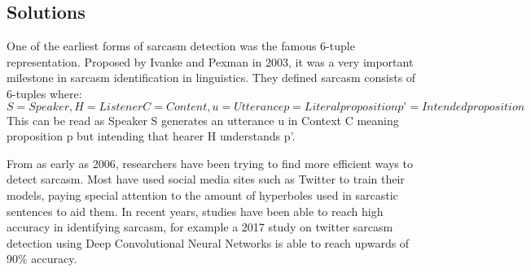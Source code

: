 \documentclass{article}
\begin{document}
	\subsection{Solutions}
	
	One of the earliest forms of sarcasm detection was the famous 6-tuple representation. Proposed by Ivanke and Pexman \cite{stacey} in 2003, it was a very important milestone in sarcasm identification in linguistics. They defined sarcasm consists of 6-tuples where: $S= Speaker, H= Listener C= Content, u= Utterance p= Literal proposition p’= Intended proposition$ This can be read as Speaker S generates an utterance u in Context C meaning proposition p but intending that hearer H understands p’. \par
	
	From as early as 2006\cite{tepperman}, researchers have been trying to find more efficient ways to detect sarcasm. Most have used social media sites such as Twitter to train their models\cite{dmitry}, paying special attention to the amount of hyperboles used in sarcastic sentences to aid them. In recent years, studies have been able to reach high accuracy in identifying sarcasm, for example a 2017 study on twitter sarcasm detection using Deep Convolutional Neural Networks\cite{shelly} is able to reach upwards of 90\% accuracy.
	
	\printbibliography
	
	
\end{document}
